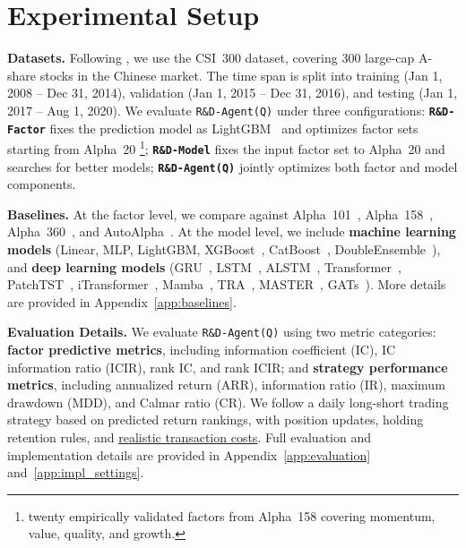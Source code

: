 \documentclass{article}
\newcommand{\name}{\texttt{R\&D-Agent(Q)}}
\begin{document}
\newpage
\section{Experimental Setup}
\label{sec:experiments}
\textbf{ Datasets.}
Following \cite{li2024alphafin, FactorVAE, lin2021learning, li2024master}, we use the CSI~300 dataset, covering 300 large-cap A-share stocks in the Chinese market. The time span is split into training (Jan 1, 2008 – Dec 31, 2014), validation (Jan 1, 2015 – Dec 31, 2016), and testing (Jan 1, 2017 – Aug 1, 2020).
We evaluate \texttt{\name} under three configurations:  \textbf{\texttt{R\&D-Factor}} fixes the prediction model as LightGBM~\cite{ke2017lightgbm} and optimizes factor sets starting from Alpha~20 \footnote{twenty empirically validated factors from Alpha~158 covering momentum, value, quality, and growth.};
 \textbf{\texttt{R\&D-Model}} fixes the input factor set to Alpha~20 and searches for better models;
 \textbf{\texttt{\name}} jointly optimizes both factor and model components.

\textbf{ Baselines.}
At the factor level, we compare against Alpha~101~\cite{kakushadze2016101formulaicalphas}, Alpha~158~\cite{alpha158}, Alpha~360~\cite{alpha360}, and AutoAlpha~\cite{kou2024automate}.
At the model level, we include \textbf{machine learning models} (Linear, MLP, LightGBM\cite{ke2017lightgbm}, XGBoost~\cite{chen2016xgboost}, CatBoost~\cite{prokhorenkova2018catboost}, DoubleEnsemble~\cite{zhang2020doubleensemble}), and \textbf{deep learning models} (GRU~\cite{cho-etal-2014-learning}, LSTM~\cite{hochreiter1997long}, ALSTM~\cite{qin2017dual}, Transformer~\cite{NIPS2017_3f5ee243}, PatchTST~\cite{nietime}, iTransformer~\cite{liuitransformer}, Mamba~\cite{gumamba}, TRA~\cite{lin2021learning}, MASTER~\cite{li2024master}, GATs~\cite{velivckovic2018graph}). More details are provided in Appendix~\ref{app:baselines}.

\textbf{ Evaluation Details.}
We evaluate \texttt{\name} using two metric categories: \textbf{factor predictive metrics}, including information coefficient (IC), IC information ratio (ICIR), rank IC, and rank ICIR; and \textbf{strategy performance metrics}, including annualized return (ARR), information ratio (IR), maximum drawdown (MDD), and Calmar ratio (CR). We follow a daily long-short trading strategy based on predicted return rankings, with position updates, holding retention rules, and \uline{realistic transaction costs}. Full evaluation and implementation details are provided in Appendix~\ref{app:evaluation} and~\ref{app:impl_settings}.
\end{document}
